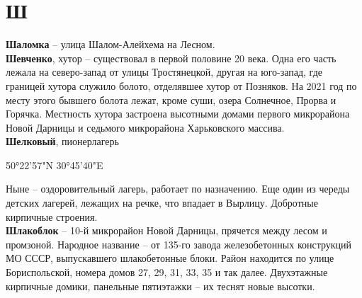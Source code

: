 \chapter*{Ш}

\textbf{Шаломка} – улица Шалом-Алейхема на Лесном.\\

\textbf{Шевченко}, хутор – существовал в первой половине 20 века. Одна его часть лежала на северо-запад от улицы Тростянецкой, другая на юго-запад, где границей хутора служило болото, отделявшее хутор от Позняков. На 2021 год по месту этого бывшего болота лежат, кроме суши, озера Солнечное, Прорва и Горячка. Местность хутора застроена высотными домами первого микрорайона Новой Дарницы и седьмого микрорайона Харьковского массива.\\

\textbf{Шелковый}, пионерлагерь

50°22'57"N 30°45'40"E

Ныне – оздоровительный лагерь, работает по назначению. Еще один из череды детских лагерей, лежащих на речке, что впадает в Вырлицу. Добротные кирпичные строения.\\

\textbf{Шлакоблок} – 10-й микрорайон Новой Дарницы, прячется между лесом и промзоной. Народное название – от 135-го завода железобетонных конструкций МО СССР, выпускавшего шлакобетонные блоки. Район находится по улице Бориспольской, номера домов 27, 29, 31, 33, 35 и так далее. Двухэтажные кирпичные домики, панельные пятиэтажки – их теснят новые высотки.
